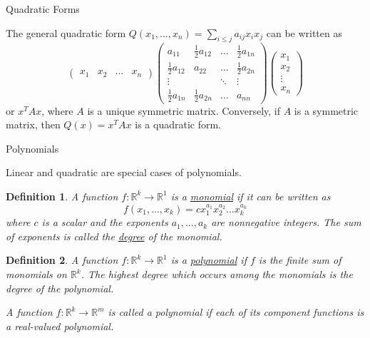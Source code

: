 \documentclass[xcolor=dvipsnames, compress, t]{beamer}
\newtheorem{defin}{Definition}
\begin{document}
\begin{frame}{Quadratic Forms}

\begin{theorem}
The general quadratic form $Q(x_1, ..., x_n) = \sum_{i \leq j} a_{ij} x_i x_j$ can be written as
$$\begin{pmatrix}x_1 & x_2 & \hdots & x_n\end{pmatrix} \begin{pmatrix} a_{11} & \frac{1}{2}a_{12} & \hdots & \frac{1}{2}a_{1n} \\ \frac{1}{2}a_{12} & a_{22} & \hdots & \frac{1}{2}a_{2n} \\ \vdots & &\ddots &\vdots \\  \frac{1}{2}a_{1n} & \frac{1}{2}a_{2n} & \hdots & a_{nn}\end{pmatrix} \begin{pmatrix} x_1 \\ x_2 \\ \vdots \\x_n \end{pmatrix} $$
or $x^T A x$, where $A$ is a unique symmetric matrix. Conversely, if $A$ is a symmetric matrix, then $Q(x) = x^T A x$ is a quadratic form.
\end{theorem}


\end{frame}

\begin{frame}{Polynomials}

Linear and quadratic are special cases of polynomials. \pause

\begin{defin}
A function $f: \mathds{R}^k \rightarrow \mathds{R}^1$ is a \underline{monomial} if it can be written as $$f(x_1, ..., x_k) = c x_1^{a_1} x_2^{a_2} ... x_k^{a_k}$$ where $c$ is a scalar and the exponents $a_1, ..., a_k$ are nonnegative integers. The sum of exponents is called the \underline{degree} of the monomial.
\end{defin} \pause

\begin{defin}
A function $f: \mathds{R}^k \rightarrow \mathds{R}^1$ is a \underline{polynomial} if $f$ is the finite sum of monomials on $\mathds{R}^k$. The highest degree which occurs among the monomials is the degree of the polynomial.

A function $f: \mathds{R}^k \rightarrow \mathds{R}^m$ is called a polynomial if each of its component functions is a real-valued polynomial.
\end{defin}


\end{frame}
\end{document}
